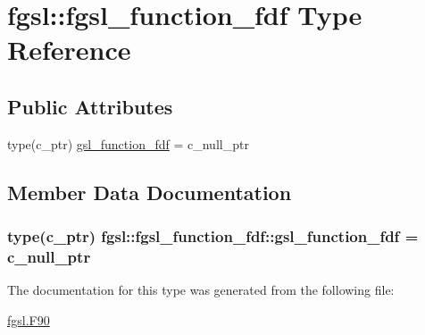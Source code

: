 \hypertarget{structfgsl_1_1fgsl__function__fdf}{}\section{fgsl\+:\+:fgsl\+\_\+function\+\_\+fdf Type Reference}
\label{structfgsl_1_1fgsl__function__fdf}
\subsection*{Public Attributes}
\begin{DoxyCompactItemize}
\item 
type(c\+\_\+ptr) \hyperlink{structfgsl_1_1fgsl__function__fdf_a084f8ac7c74ec8371923ffc2185d668e}{gsl\+\_\+function\+\_\+fdf} = c\+\_\+null\+\_\+ptr
\end{DoxyCompactItemize}


\subsection{Member Data Documentation}
\hypertarget{structfgsl_1_1fgsl__function__fdf_a084f8ac7c74ec8371923ffc2185d668e}{}
\subsubsection[{gsl\+\_\+function\+\_\+fdf}]{\setlength{\rightskip}{0pt plus 5cm}type(c\+\_\+ptr) fgsl\+::fgsl\+\_\+function\+\_\+fdf\+::gsl\+\_\+function\+\_\+fdf = c\+\_\+null\+\_\+ptr}\label{structfgsl_1_1fgsl__function__fdf_a084f8ac7c74ec8371923ffc2185d668e}


The documentation for this type was generated from the following file\+:\begin{DoxyCompactItemize}
\item 
\hyperlink{fgsl_8F90}{fgsl.\+F90}\end{DoxyCompactItemize}
